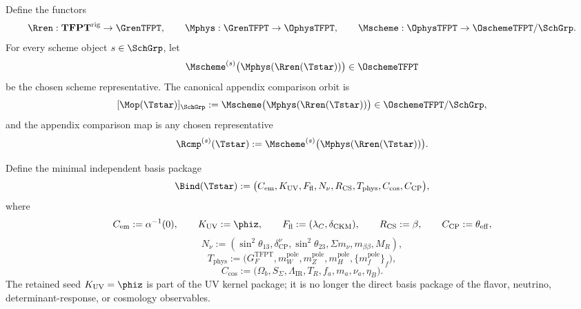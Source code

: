 \begin{definition}
\label{def:canonical-measurement-orbit}
Define the functors
\[
\Rren:\mathbf{TFPT}^{\mathrm{rig}}\to\GrenTFPT,
\qquad
\Mphys:\GrenTFPT\to\OphysTFPT,
\qquad
\Mscheme:\OphysTFPT\to\OschemeTFPT/\SchGrp.
\]
For every scheme object $s\in\SchGrp$, let
\[
\Mscheme^{(s)}\bigl(\Mphys(\Rren(\Tstar))\bigr)\in\OschemeTFPT
\]
be the chosen scheme representative. The canonical appendix comparison orbit is
\[
[\Mop(\Tstar)]_{\SchGrp}
:=
\Mscheme\bigl(\Mphys(\Rren(\Tstar))\bigr)
\in \OschemeTFPT/\SchGrp,
\]
and the appendix comparison map is any chosen representative
\[
\Rcmp^{(s)}(\Tstar):=
\Mscheme^{(s)}\bigl(\Mphys(\Rren(\Tstar))\bigr).
\]
\end{definition}

\begin{definition}
\label{def:minimal-observable-basis}
Define the minimal independent basis package
\[
\Bind(\Tstar):=
\bigl(
C_{\mathrm{em}},
K_{\mathrm{UV}},
F_{\mathrm{fl}},
N_{\nu},
R_{\mathrm{CS}},
T_{\mathrm{phys}},
C_{\mathrm{cos}},
C_{\mathrm{CP}}
\bigr),
\]
where
\[
C_{\mathrm{em}}:=\alpha^{-1}(0),
\qquad
K_{\mathrm{UV}}:=\phiz,
\qquad
F_{\mathrm{fl}}:=(\lambda_C,\delta_{\mathrm{CKM}}),
\qquad
R_{\mathrm{CS}}:=\beta,
\qquad
C_{\mathrm{CP}}:=\theta_{\mathrm{eff}},
\]
\[
N_{\nu}:=(\sin^2\theta_{13},\delta_{\mathrm{CP}}^\nu,\sin^2\theta_{23},\Sigma m_\nu,m_{\beta\beta},M_R),
\]
\[
T_{\mathrm{phys}}
:=
\bigl(
G_F^{\mathrm{TFPT}},
m_W^{\mathrm{pole}},
m_Z^{\mathrm{pole}},
m_H^{\mathrm{pole}},
\{m_f^{\mathrm{pole}}\}_f
\bigr),
\]
\[
C_{\mathrm{cos}}
:=
\bigl(
\Omega_b,S_\Sigma,\Lambda_{\mathrm{IR}},T_R,f_a,m_a,\nu_a,\eta_B
\bigr).
\]
The retained seed $K_{\mathrm{UV}}=\phiz$ is part of the UV kernel package; it is no longer the
direct basis package of the flavor, neutrino, determinant-response, or cosmology observables.
\end{definition}

